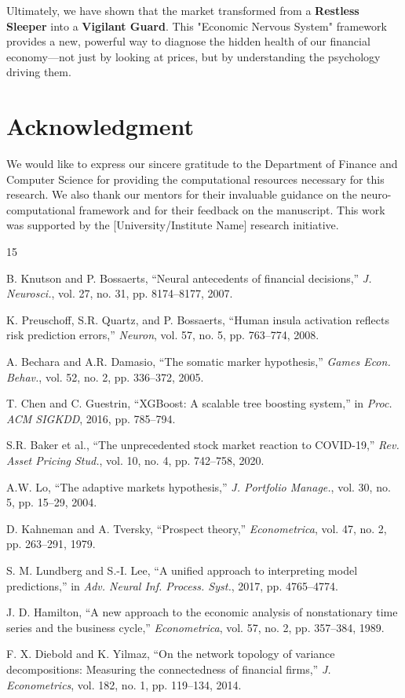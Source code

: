 \documentclass[conference]{IEEEtran}
\begin{document}
Ultimately, we have shown that the market transformed from a \textbf{Restless Sleeper} into a \textbf{Vigilant Guard}. This "Economic Nervous System" framework provides a new, powerful way to diagnose the hidden health of our financial economy—not just by looking at prices, but by understanding the psychology driving them.

\section*{Acknowledgment}
We would like to express our sincere gratitude to the Department of Finance and Computer Science for providing the computational resources necessary for this research. We also thank our mentors for their invaluable guidance on the neuro-computational framework and for their feedback on the manuscript. This work was supported by the [University/Institute Name] research initiative.

\begin{thebibliography}{15}

B. Knutson and P. Bossaerts, ``Neural antecedents of financial decisions,'' \textit{J. Neurosci.}, vol. 27, no. 31, pp. 8174--8177, 2007.

K. Preuschoff, S.R. Quartz, and P. Bossaerts, ``Human insula activation reflects risk prediction errors,'' \textit{Neuron}, vol. 57, no. 5, pp. 763--774, 2008.

A. Bechara and A.R. Damasio, ``The somatic marker hypothesis,'' \textit{Games Econ. Behav.}, vol. 52, no. 2, pp. 336--372, 2005.

T. Chen and C. Guestrin, ``XGBoost: A scalable tree boosting system,'' in \textit{Proc. ACM SIGKDD}, 2016, pp. 785--794.

S.R. Baker et al., ``The unprecedented stock market reaction to COVID-19,'' \textit{Rev. Asset Pricing Stud.}, vol. 10, no. 4, pp. 742--758, 2020.

A.W. Lo, ``The adaptive markets hypothesis,'' \textit{J. Portfolio Manage.}, vol. 30, no. 5, pp. 15--29, 2004.

D. Kahneman and A. Tversky, ``Prospect theory,'' \textit{Econometrica}, vol. 47, no. 2, pp. 263--291, 1979.

S. M. Lundberg and S.-I. Lee, ``A unified approach to interpreting model predictions,'' in \textit{Adv. Neural Inf. Process. Syst.}, 2017, pp. 4765--4774.

J. D. Hamilton, ``A new approach to the economic analysis of nonstationary time series and the business cycle,'' \textit{Econometrica}, vol. 57, no. 2, pp. 357--384, 1989.

F. X. Diebold and K. Yilmaz, ``On the network topology of variance decompositions: Measuring the connectedness of financial firms,'' \textit{J. Econometrics}, vol. 182, no. 1, pp. 119--134, 2014.

\end{thebibliography}
\end{document}
